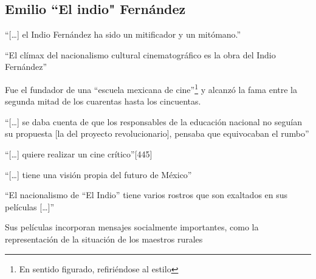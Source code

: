 \subsection{Emilio ``El indio" Fernández}
    \begin{compactitem}
    \item ``[\ldots] el Indio Fernández ha sido un mitificador y un mitómano.''\autocite[445]{cosio_villegas_notas_1976}
    \item ``El clímax del nacionalismo cultural cinematográfico es la obra del Indio Fernández''\autocite[444]{cosio_villegas_notas_1976}
    \item Fue el fundador de una ``escuela mexicana de cine''\footnote{En sentido figurado, refiriéndose al estilo} y alcanzó la fama entre la segunda mitad de los cuarentas hasta los cincuentas\autocite[133]{mora_mexican_1978-2}.
    \item{``[\ldots] se daba cuenta de que los responsables de la educación nacional no seguían su propuesta [la del proyecto revolucionario], pensaba que equivocaban el rumbo}''\autocite[466]{pablos_escuela_1998-1}
    \item{``[\ldots] quiere realizar un cine crítico}''[445]\autocite[466]{pablos_escuela_1998-1}
    \item{``[\ldots] tiene una visión propia del futuro de México''}\autocite[158]{aguilar_construccion_2014-1}
    \item{``El nacionalismo de ``El Indio'' tiene varios rostros que son exaltados en sus películas [\ldots]}''\autocite[127]{aguilar_construccion_2014-1}
    \item Sus películas incorporan mensajes socialmente importantes, como la representación  de la situación de los maestros rurales\autocite[72]{tierney_myths_2002}
    \end{compactitem} 

